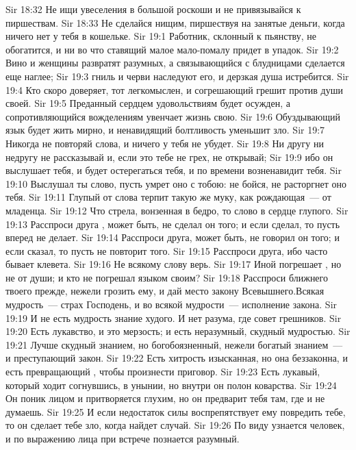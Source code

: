 \vs Sir 18:32 Не ищи увеселения в большой роскоши и не привязывайся к пиршествам.
\vs Sir 18:33 Не сделайся нищим, пиршествуя на занятые деньги, когда ничего нет у тебя в кошельке.
\vs Sir 19:1 Работник, склонный к пьянству, не обогатится, и ни во что ставящий малое мало-помалу придет в упадок.
\vs Sir 19:2 Вино и женщины развратят разумных, а связывающийся с блудницами сделается еще наглее;
\vs Sir 19:3 гниль и черви наследуют его, и дерзкая душа истребится.
\vs Sir 19:4 Кто скоро доверяет, тот легкомыслен, и согрешающий грешит против души своей.
\vs Sir 19:5 Преданный сердцем удовольствиям будет осужден, а сопротивляющийся вожделениям увенчает жизнь свою.
\vs Sir 19:6 Обуздывающий язык будет жить мирно, и ненавидящий болтливость уменьшит зло.
\vs Sir 19:7 Никогда не повторяй слова, и ничего у тебя не убудет.
\vs Sir 19:8 Ни другу ни недругу не рассказывай и, если это тебе не грех, не открывай;
\vs Sir 19:9 ибо он выслушает тебя, и будет остерегаться тебя, и по времени возненавидит тебя.
\vs Sir 19:10 Выслушал ты слово, пусть умрет оно с тобою: не бойся, не расторгнет оно тебя.
\vs Sir 19:11 Глупый от слова терпит такую же муку, как рождающая~--- от младенца.
\vs Sir 19:12 Что стрела, вонзенная в бедро, то слово в сердце глупого.
\vs Sir 19:13 Расспроси друга , может быть, не сделал он того; и если сделал, то пусть вперед не делает.
\vs Sir 19:14 Расспроси друга, может быть, не говорил он того; и если сказал, то пусть не повторит того.
\vs Sir 19:15 Расспроси друга, ибо часто бывает клевета.
\vs Sir 19:16 Не всякому слову верь.
\vs Sir 19:17 Иной погрешает , но не от души; и кто не погрешал языком своим?
\vs Sir 19:18 Расспроси ближнего твоего прежде, нежели грозить ему, и дай место закону Всевышнего.\rsbpar Всякая мудрость~--- страх Господень, и во всякой мудрости~--- исполнение закона.
\vs Sir 19:19 И не есть мудрость знание худого. И нет разума, где совет грешников.
\vs Sir 19:20 Есть лукавство, и это мерзость; и есть неразумный, скудный мудростью.
\vs Sir 19:21 Лучше скудный знанием, но богобоязненный, нежели богатый знанием~--- и преступающий закон.
\vs Sir 19:22 Есть хитрость изысканная, но она беззаконна, и есть превращающий , чтобы произнести приговор.
\vs Sir 19:23 Есть лукавый, который ходит согнувшись, в унынии, но внутри он полон коварства.
\vs Sir 19:24 Он поник лицом и притворяется глухим, но он предварит тебя там, где и не думаешь.
\vs Sir 19:25 И если недостаток силы воспрепятствует ему повредить тебе, то он сделает тебе зло, когда найдет случай.
\vs Sir 19:26 По виду узнается человек, и по выражению лица при встрече познается разумный.
